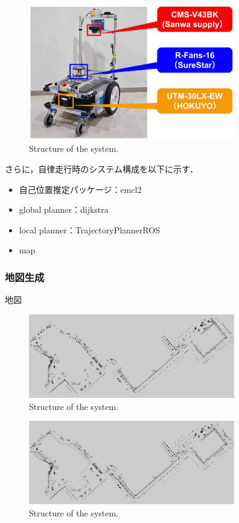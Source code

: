 \documentclass[twocolumn, 9pt]{jsproceedings}
\begin{document}
\begin{figure}[h!]
  \centering
  \includegraphics[width=90mm]{fig/box2_sensor_cut2.pdf}
  \caption{Structure of the system.}
  \label{fig:box2-sensor}
\end{figure}


さらに，自律走行時のシステム構成を以下に示す．

\begin{itemize}
  \item 自己位置推定パッケージ：emcl2\cite{emcl2}
  \item global planner：dijkstra
  \item local planner：TrajectoryPlannerROS
  \item map
\end{itemize}


\subsubsection{地図生成}
地図

\begin{figure}[h!]
  \centering
  \includegraphics[width=90mm]{fig/map.pdf}
  \caption{Structure of the system.}
  \label{fig:map}
\end{figure}

\begin{figure}[h!]
  \centering
  \includegraphics[width=90mm]{fig/costmap.pdf}
  \caption{Structure of the system.}
  \label{fig:costmap}
\end{figure}
\end{document}
